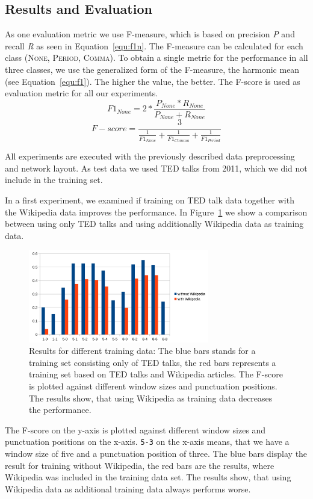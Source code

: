 \subsection{Results and Evaluation}

As one evaluation metric we use F-measure, which is based on precision \emph{P} and recall \emph{R} as seen in Equation~\ref{equ:f1n}.
The F-measure can be calculated for each class (\textsc{None}, \textsc{Period}, \textsc{Comma}).
To obtain a single metric for the performance in all three classes, we use the generalized form of the F-measure, the harmonic mean (see Equation~\ref{equ:f1}).
The higher the value, the better.
The F-score is used as evaluation metric for all our experiments.
\begin{equation}
\label{equ:f1n}
F1_{None} = 2 * \frac{P_{None}* R_{None}}{P_{None}+R_{None}}
\end{equation}
\begin{equation}
\label{equ:f1}
F-score = \frac{3}{\frac{1}{F1_{None}} + \frac{1}{F1_{Comma}} + \frac{1}{F1_{Period}}}
\end{equation}

All experiments are executed with the previously described data preprocessing and network layout.
As test data we used TED talks from 2011, which we did not include in the training set.

In a first experiment, we examined if training on TED talk data together with the Wikipedia data improves the performance. 
In Figure~\ref{fig:window_wiki_eval} we show a comparison between using only TED talks and using additionally Wikipedia data as training data.
\begin{figure}[ht]
    \centering
    \includegraphics[width=0.7\textwidth]{img/window_wiki_eval.png}
    \caption{Results for different training data: The blue bars stands for a training set consisting only of TED talks, the red bars represents a training set based on TED talks and Wikipedia articles. The F-score is plotted against different window sizes and punctuation positions. The results show, that using Wikipedia as training data decreases the performance.}
    \label{fig:window_wiki_eval}
\end{figure}
The F-score on the y-axis is plotted against different window sizes and punctuation positions on the x-axis.
\texttt{5-3} on the x-axis means, that we have a window size of five and a punctuation position of three.
The blue bars display the result for training without Wikipedia, the red bars are the results, where Wikipedia was included in the training data set.
The results show, that using Wikipedia data as additional training data always performs worse.

